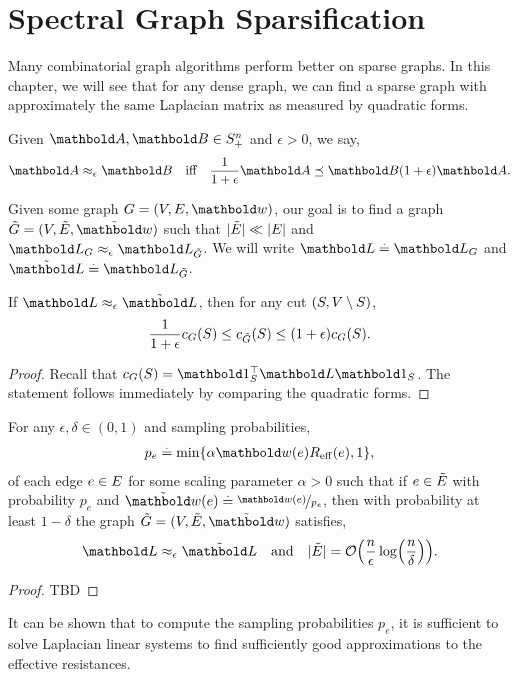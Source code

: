 
\chapter{Spectral Graph Sparsification}

Many combinatorial graph algorithms perform better on sparse graphs. In this chapter, we will see that for any dense graph, we can find a sparse graph with approximately the same Laplacian matrix as measured by quadratic forms.

\begin{defn} Given $\mA, \mB \in \sS_+^n$ and $\epsilon > 0$, we say, \begin{align}
    \mA \approx_\epsilon \mB \quad\text{iff}\quad \frac{1}{1+\epsilon}\mA \preceq \mB (1+\epsilon)\mA.
\end{align}
\end{defn}

Given some graph $G = (\sV,\sE,\vw)$, our goal is to find a graph $\Tilde{G} = (\sV,\Tilde{\sE},\Tilde{\vw})$ such that $|\Tilde{E}| \ll |E|$ and $\mL_G \approx_\epsilon \mL_{\Tilde{G}}$. We will write $\mL \defeq \mL_G$ and $\Tilde{\mL} \defeq \mL_{\Tilde{G}}$.

\begin{lem}
If $\mL \approx_\epsilon \Tilde{\mL}$, then for any cut $(S, V \setminus S)$, \begin{align}
    \frac{1}{1+\epsilon}c_G(S) \leq c_{\Tilde{G}}(S) \leq (1+\epsilon)c_G(S).
\end{align}
\end{lem}
\begin{proof}
Recall that $c_G(\sS) = \trans{\vOne_\sS}\mL\vOne_\sS$. The statement follows immediately by comparing the quadratic forms.
\end{proof}

\begin{thm}
For any $\epsilon, \delta \in (0,1)$ and sampling probabilities, \begin{align}
    p_e \defeq \min\{\alpha \vw(e) \Reff(e), 1\},
\end{align} of each edge $e \in E$ for some scaling parameter $\alpha > 0$ such that if $e \in \Tilde{E}$ with probability $p_e$ and $\Tilde{\vw}(e) \defeq \nicefrac{\vw(e)}{p_e}$, then with probability at least $1-\delta$ the graph $\Tilde{G} = (\sV,\Tilde{\sE},\Tilde{\vw})$ satisfies,\cite{spielman2011graph} \begin{align*}
    \mL \approx_\epsilon \Tilde{\mL} \quad\text{and}\quad |\Tilde{\sE}| = \LandauO{\frac{n}{\epsilon} \log\parentheses*{\frac{n}{\delta}}}.
\end{align*}
\end{thm}
\begin{proof}
TBD
\end{proof}

\begin{rmk}
It can be shown that to compute the sampling probabilities $p_e$, it is sufficient to solve Laplacian linear systems to find sufficiently good approximations to the effective resistances.
\end{rmk}